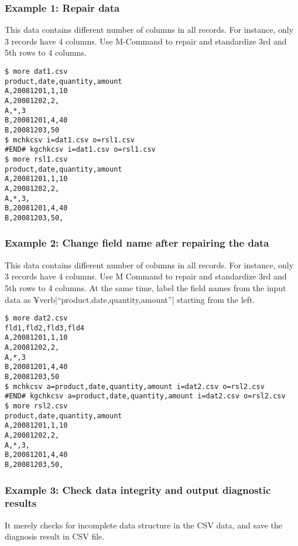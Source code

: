 \subsubsection*{Example 1: Repair data}

This data contains different number of columns in all records. For instance, only 3 records have 4 columns. Use M-Command to repair and standardize 3rd and 5th rows to 4 columns.


\begin{Verbatim}[baselinestretch=0.7,frame=single]
$ more dat1.csv
product,date,quantity,amount
A,20081201,1,10
A,20081202,2,
A,*,3
B,20081201,4,40
B,20081203,50
$ mchkcsv i=dat1.csv o=rsl1.csv
#END# kgchkcsv i=dat1.csv o=rsl1.csv
$ more rsl1.csv
product,date,quantity,amount
A,20081201,1,10
A,20081202,2,
A,*,3,
B,20081201,4,40
B,20081203,50,
\end{Verbatim}
\subsubsection*{Example 2: Change field name after repairing the data}

This data contains different number of columns in all records. For instance, only 3 records have 4 columns. Use M Command to repair and standardize 3rd and 5th rows to 4 columns. At the same time, label the field names from the input data as ¥verb|“product,date,quantity,amount”| starting from the left.


\begin{Verbatim}[baselinestretch=0.7,frame=single]
$ more dat2.csv
fld1,fld2,fld3,fld4
A,20081201,1,10
A,20081202,2,
A,*,3
B,20081201,4,40
B,20081203,50
$ mchkcsv a=product,date,quantity,amount i=dat2.csv o=rsl2.csv
#END# kgchkcsv a=product,date,quantity,amount i=dat2.csv o=rsl2.csv
$ more rsl2.csv
product,date,quantity,amount
A,20081201,1,10
A,20081202,2,
A,*,3,
B,20081201,4,40
B,20081203,50,
\end{Verbatim}
\subsubsection*{Example 3: Check data integrity and output diagnostic results}

It merely checks for incomplete data structure in the CSV data, and save the diagnosis result in CSV file.


